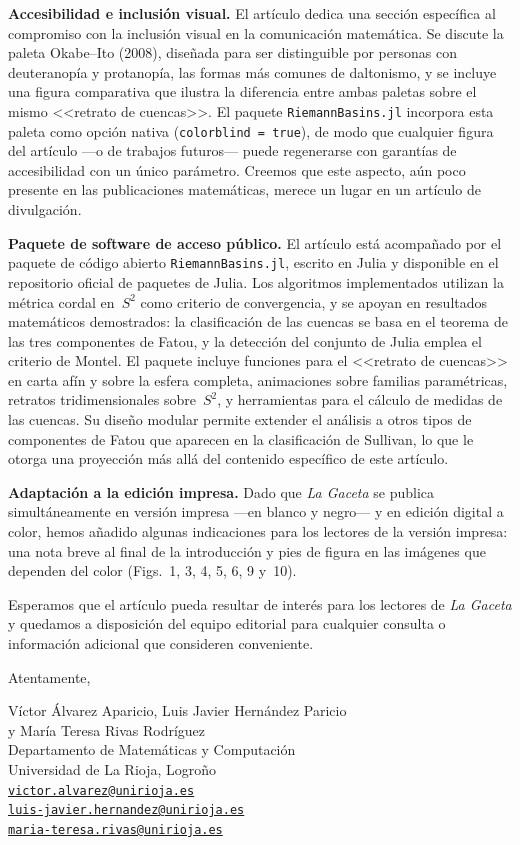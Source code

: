 \documentclass[a4paper,12pt]{article}
\begin{document}
\medskip
\noindent\textbf{Accesibilidad e inclusión visual.}
El artículo dedica una sección específica al compromiso con la inclusión
visual en la comunicación matemática. Se discute la paleta Okabe--Ito
(2008), diseñada para ser distinguible por personas con deuteranopía y
protanopía, las formas más comunes de daltonismo, y se incluye una figura
comparativa que ilustra la diferencia entre ambas paletas sobre el mismo
<<retrato de cuencas>>. El paquete \texttt{RiemannBasins.jl} incorpora esta
paleta como opción nativa (\texttt{colorblind\,=\,true}), de modo que
cualquier figura del artículo ---o de trabajos futuros--- puede
regenerarse con garantías de accesibilidad con un único parámetro.
Creemos que este aspecto, aún poco presente en las publicaciones
matemáticas, merece un lugar en un artículo de divulgación.

\medskip
\noindent\textbf{Paquete de software de acceso público.}
El artículo está acompañado por el paquete de código abierto
\texttt{RiemannBasins.jl}, escrito en Julia y disponible en el
repositorio oficial de paquetes de Julia. Los algoritmos implementados utilizan la métrica cordal en~$S^2$ como
criterio de convergencia, y se apoyan en resultados matemáticos
demostrados: la clasificación de las cuencas se basa en el teorema de
las tres componentes de Fatou, y la detección del conjunto de Julia
emplea el criterio de Montel. El paquete
incluye funciones para el <<retrato de cuencas>> en carta afín y sobre la
esfera completa, animaciones sobre familias paramétricas, retratos
tridimensionales sobre~$S^2$, y herramientas para el cálculo de medidas
de las cuencas. Su diseño modular permite extender el análisis a otros
tipos de componentes de Fatou que aparecen en la clasificación de
Sullivan, lo que le otorga una proyección más allá del contenido
específico de este artículo.

\medskip
\noindent\textbf{Adaptación a la edición impresa.}
Dado que \emph{La Gaceta} se publica simultáneamente en versión
impresa ---en blanco y negro--- y en edición digital a color, hemos
añadido algunas indicaciones para los lectores de la versión impresa:
una nota breve al final de la introducción y pies de figura en las
imágenes que dependen del color (Figs.~1, 3, 4, 5, 6, 9 y~10).

\medskip
Esperamos que el artículo pueda resultar de interés para los lectores de
\emph{La Gaceta} y quedamos a disposición del equipo editorial para
cualquier consulta o información adicional que consideren conveniente.

\bigskip
\noindent
Atentamente,

\bigskip\bigskip
\noindent
Víctor Álvarez Aparicio, Luis Javier Hernández Paricio\\
y María Teresa Rivas Rodríguez\\[2pt]
Departamento de Matemáticas y Computación\\
Universidad de La Rioja, Logroño\\[4pt]
\href{mailto:victor.alvarez@unirioja.es}{\texttt{victor.alvarez@unirioja.es}}\\
\href{mailto:luis-javier.hernandez@unirioja.es}{\texttt{luis-javier.hernandez@unirioja.es}}\\
\href{mailto:maria-teresa.rivas@unirioja.es}{\texttt{maria-teresa.rivas@unirioja.es}}
\end{document}
